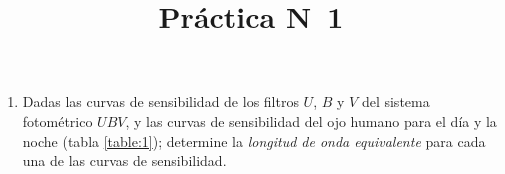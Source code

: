 \documentclass[12pt,spanish,a4paper]{practice}
\begin{document}
  \title{Práctica N\textdegree\ 1}
  \maketitle

  \begin{enumerate}[wide, labelwidth=!, labelindent=0pt, label=\textbf{\textrm{\arabic*)}}, ref=\arabic*]
    \item \label{prob:1} Dadas las curvas de sensibilidad de los filtros $U$, $B$ y $V$ del sistema fotométrico $UBV$, y las curvas de sensibilidad del ojo humano para el día y la noche (tabla \ref{table:1}); determine la \emph{longitud de onda equivalente} para cada una de las curvas de sensibilidad.


\end{enumerate}
\end{document}
